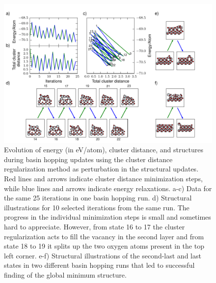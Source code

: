 \documentclass[aip,amsmath,amssymb,reprint]{revtex4-1}
\begin{document}
\begin{figure}[tb]
    \centering
    \includegraphics[width=2.0\columnwidth]{fig6-minimize.pdf}
    \caption{Evolution of energy (in eV/atom), cluster distance, and structures
      during basin hopping updates using the cluster distance
      regularization method as perturbation in the structural
      updates. Red lines and arrows indicate cluster distance
      minimization steps, while blue lines and arrows indicate energy
      relaxations. a-c) Data for the same 25 iterations in one basin
      hopping run. d) Structural illustrations for 10 selected
      iterations from the same run. The progress in the individual
      minimization steps is small and sometimes hard to
      appreciate. However, from state 16 to 17 the cluster
      regularization acts to fill the vacancy in the second layer and
      from state 18 to 19 it splits up the two oxygen atoms present in
      the top left corner. e-f) Structural illustrations of the
      second-last and last states in two different basin hopping runs that led to
      successful finding of the global minimum structure.}
    \label{fig_min}
\end{figure}
\end{document}
